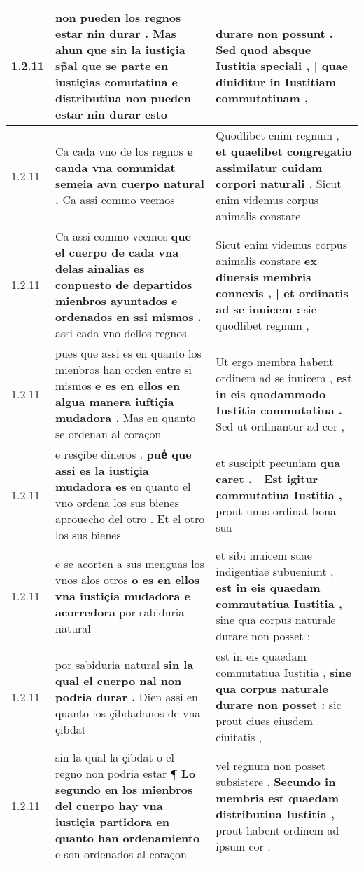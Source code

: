 \begin{tabular}{|p{1cm}|p{6.5cm}|p{6.5cm}|}
1.2.11 & non pueden los regnos estar nin durar . \textbf{ Mas ahun que sin la iustiçia sp̃al que se parte en iustiçias comutatiua e distributiua } non pueden estar nin durar esto & durare non possunt . \textbf{ Sed quod absque Iustitia speciali , | quae diuiditur } in Iustitiam commutatiuam , \\\hline
1.2.11 & Ca cada vno de los regnos \textbf{ e canda vna comunidat semeia avn cuerpo natural . } Ca assi commo veemos & Quodlibet enim regnum , \textbf{ et quaelibet congregatio assimilatur cuidam corpori naturali . } Sicut enim videmus corpus animalis constare \\\hline
1.2.11 & Ca assi commo veemos \textbf{ que el cuerpo de cada vna delas ainalias es conpuesto de departidos mienbros ayuntados e ordenados en ssi mismos . } assi cada vno dellos regnos & Sicut enim videmus corpus animalis constare \textbf{ ex diuersis membris connexis , | et ordinatis ad se inuicem : } sic quodlibet regnum , \\\hline
1.2.11 & pues que assi es en quanto los mienbros han orden entre si mismos \textbf{ e es en ellos en algua manera iuftiçia mudadora . } Mas en quanto se ordenan al coraçon & Ut ergo membra habent ordinem ad se inuicem , \textbf{ est in eis quodammodo Iustitia commutatiua . } Sed ut ordinantur ad cor , \\\hline
1.2.11 & e resçibe dineros . \textbf{ pueᷤ que assi es la iustiçia mudadora es } en quanto el vno ordena los sus bienes aprouecho del otro . Et el otro los sus bienes & et suscipit pecuniam \textbf{ qua caret . | Est igitur commutatiua Iustitia , } prout unus ordinat bona sua \\\hline
1.2.11 & e se acorten a sus menguas los vnos alos otros \textbf{ o es en ellos vna iustiçia mudadora e acorredora } por sabiduria natural & et sibi inuicem suae indigentiae subueniunt , \textbf{ est in eis quaedam commutatiua Iustitia , } sine qua corpus naturale durare non posset : \\\hline
1.2.11 & por sabiduria natural \textbf{ sin la qual el cuerpo nal non podria durar . } Dien assi en quanto los çibdadanos de vna çibdat & est in eis quaedam commutatiua Iustitia , \textbf{ sine qua corpus naturale durare non posset : } sic prout ciues eiusdem ciuitatis , \\\hline
1.2.11 & sin la qual la çibdat o el regno non podria estar ¶ \textbf{ Lo segundo en los mienbros del cuerpo hay vna iustiçia partidora en quanto han ordenamiento } e son ordenados al coraçon . & vel regnum non posset subsistere . \textbf{ Secundo in membris est quaedam distributiua Iustitia , } prout habent ordinem ad ipsum cor . \\\hline

\end{tabular}
